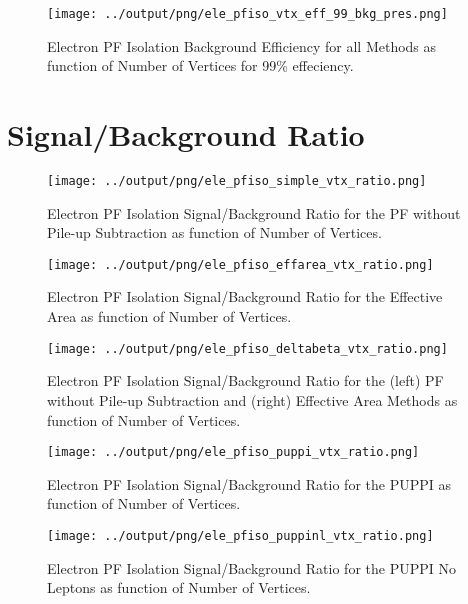 \documentclass[11pt]{book}
\begin{document}
\begin{figure}[htb]
\centering
\texttt{[image: ../output/png/ele\_pfiso\_vtx\_eff\_99\_bkg\_pres.png]}
\caption{Electron PF Isolation Background Efficiency for all Methods as function of Number of Vertices for 99\% effeciency.}
\label{fig:ele_pfiso_vtx_eff_99_bkg_pres}
\end{figure}
\clearpage

\chapter{Signal/Background Ratio}
\begin{figure}[htb]
\centering
\texttt{[image: ../output/png/ele\_pfiso\_simple\_vtx\_ratio.png]}
\caption{Electron PF Isolation Signal/Background Ratio for the PF without Pile-up Subtraction as function of Number of Vertices.}
\label{fig:ele_pfiso_vtx_ratio_simple}
\end{figure}

\begin{figure}[htb]
\centering
\texttt{[image: ../output/png/ele\_pfiso\_effarea\_vtx\_ratio.png]}
\caption{Electron PF Isolation Signal/Background Ratio for the Effective Area as function of Number of Vertices.}
\label{fig:ele_pfiso_vtx_ratio_effarea}
\end{figure}

\begin{figure}[htb]
\centering
\texttt{[image: ../output/png/ele\_pfiso\_deltabeta\_vtx\_ratio.png]}
\caption{Electron PF Isolation Signal/Background Ratio for the (left) PF without Pile-up Subtraction and (right) Effective Area Methods as function of Number of Vertices.}
\label{fig:ele_pfiso_vtx_ratio_deltabeta}
\end{figure}

\begin{figure}[htb]
\centering
\texttt{[image: ../output/png/ele\_pfiso\_puppi\_vtx\_ratio.png]}
\caption{Electron PF Isolation Signal/Background Ratio for the PUPPI as function of Number of Vertices.}
\label{fig:ele_pfiso_vtx_ratio_puppi}
\end{figure}

\begin{figure}[htb]
\centering
\texttt{[image: ../output/png/ele\_pfiso\_puppinl\_vtx\_ratio.png]}
\caption{Electron PF Isolation Signal/Background Ratio for the PUPPI No Leptons as function of Number of Vertices.}
\label{fig:ele_pfiso_vtx_ratio_puppinl}
\end{figure}
\end{document}
